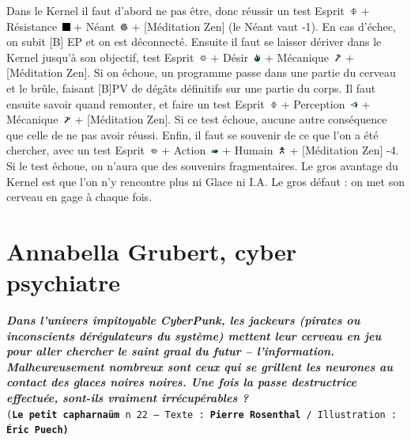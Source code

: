 \documentclass[11pt,twoside,a4paper]{article}
\def\imgESPRI{\includegraphics[width=0.25cm]{../../../../../imgGraphics/rolePlayingGame/SimulacreS/mini12x12/esprit.png} }
\def\imgPERCE{\includegraphics[width=0.25cm]{../../../../../imgGraphics/rolePlayingGame/SimulacreS/mini12x12/perception.png} }
\def\imgACTIO{\includegraphics[width=0.25cm]{../../../../../imgGraphics/rolePlayingGame/SimulacreS/mini12x12/action.png} }
\def\imgDESIR{\includegraphics[width=0.25cm]{../../../../../imgGraphics/rolePlayingGame/SimulacreS/mini12x12/desir.png} }
\def\imgRESIS{\includegraphics[width=0.25cm]{../../../../../imgGraphics/rolePlayingGame/SimulacreS/mini12x12/resistance.png} }
\def\imgHUMAI{\includegraphics[width=0.25cm]{../../../../../imgGraphics/rolePlayingGame/SimulacreS/mini12x12/humain.png} }
\def\imgMECAN{\includegraphics[width=0.25cm]{../../../../../imgGraphics/rolePlayingGame/SimulacreS/mini12x12/mecanique.png} }
\def\imgNEANT{\includegraphics[width=0.25cm]{../../../../../imgGraphics/rolePlayingGame/SimulacreS/mini12x12/neant.png} }
\begin{document}
\begin{multicols}{3}
{Dans le Kernel il faut d'abord ne pas {\^e}tre, donc r{\'e}ussir un test Esprit~\imgESPRI + R{\'e}sistance~\imgRESIS + N{\'e}ant~\imgNEANT + [M{\'e}ditation Zen] (le N{\'e}ant vaut -1). En cas d'{\'e}chec, on subit [B] EP et on est d{\'e}connect{\'e}. Ensuite il faut se laisser d{\'e}river dans le Kernel jusqu'{\`a} son objectif, test Esprit~\imgESPRI + D{\'e}sir~\imgDESIR + M{\'e}canique~\imgMECAN + [M{\'e}ditation Zen]. Si on {\'e}choue, un programme passe dans une partie du cerveau et le br{\^u}le, faisant [B]PV de d{\'e}g{\^a}ts d{\'e}finitifs sur une partie du corps. Il faut ensuite savoir quand remonter, et faire un test Esprit~\imgESPRI + Perception~\imgPERCE + M{\'e}canique~\imgMECAN + [M{\'e}ditation Zen]. Si ce test {\'e}choue, aucune autre cons{\'e}quence que celle de ne pas avoir r{\'e}ussi. Enfin, il faut se souvenir de ce que l'on a {\'e}t{\'e} chercher, avec un test Esprit~\imgESPRI + Action~\imgACTIO + Humain~\imgHUMAI + [M{\'e}ditation Zen] -4. Si le test {\'e}choue, on n'aura que des souvenirs fragmentaires. Le gros avantage du Kernel est que l'on n'y rencontre plus ni Glace ni I.A. Le gros d{\'e}faut : on met son cerveau en gage {\`a} chaque fois.~\\

} %
\end{multicols} 

\clearpage

\section{Annabella Grubert, cyber psychiatre}

\textbf{\textit{\small Dans l'univers impitoyable CyberPunk, les jackeurs (pirates ou inconscients d{\'e}r{\'e}gulateurs du syst{\`e}me) mettent leur cerveau en jeu pour aller chercher le saint graal du futur -- l'information. Malheureusement nombreux sont ceux qui se grillent les neurones au contact des glaces noires noires. Une fois la passe destructrice effectu{\'e}e, sont-ils vraiment irr{\'e}cup{\'e}rables ?}}~\\
\texttt{\scriptsize{(\textbf{Le petit capharna{\"u}m} n 22 --- Texte : \textbf{Pierre Rosenthal} / Illustration : \textbf{{\'E}ric Puech)} }}
\end{document}
